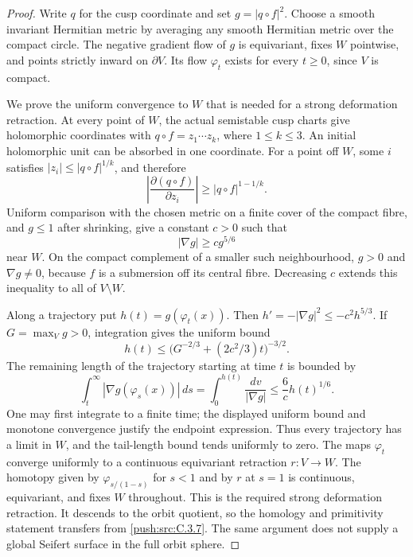 \begin{proof}
Write \(q\) for the cusp coordinate and set \(g=|q\circ f|^2\).
Choose a smooth invariant Hermitian metric by averaging any smooth
Hermitian metric over the compact circle. The negative gradient
flow of \(g\) is equivariant, fixes \(W\) pointwise, and points
strictly inward on \(\partial V\). Its flow \(\varphi_t\) exists
for every \(t\geq0\), since \(V\) is compact.

We prove the uniform convergence to \(W\) that is needed for a
strong deformation retraction. At every point of \(W\), the
actual semistable cusp charts give holomorphic coordinates with
\(q\circ f=z_1\cdots z_k\), where \(1\leq k\leq3\).
An initial holomorphic unit can be absorbed in one coordinate.
For a point off \(W\), some \(i\) satisfies
\( |z_i|\leq|q\circ f|^{1/k}\), and therefore
\[
 \left|\frac{\partial(q\circ f)}{\partial z_i}\right|
       \geq |q\circ f|^{1-1/k}.
\]
Uniform comparison with the chosen metric on a finite cover of
the compact fibre, and \(g\leq1\) after shrinking, give a
constant \(c>0\) such that
\[
 |\nabla g|\geq c g^{5/6}
\]
near \(W\). On the compact complement of a smaller such
neighbourhood, \(g>0\) and \(\nabla g\ne0\), because
\(f\) is a submersion off its central fibre. Decreasing \(c\)
extends this inequality to all of \(V\setminus W\).

Along a trajectory put \(h(t)=g(\varphi_t(x))\). Then
\(h'=-|\nabla g|^2\leq-c^2h^{5/3}\). If
\(G=\max_V g>0\), integration gives the uniform bound
\[
 h(t)\leq\bigl(G^{-2/3}+(2c^2/3)t\bigr)^{-3/2}.
\]
The remaining length of the trajectory starting at time \(t\)
is bounded by
\[
 \int_t^\infty|\nabla g(\varphi_s(x))|\,ds
 =\int_0^{h(t)}\frac{dv}{|\nabla g|}
 \leq\frac6c h(t)^{1/6}.
\]
One may first integrate to a finite time; the displayed uniform
bound and monotone convergence justify the endpoint expression.
Thus every trajectory has a limit in \(W\), and the tail-length
bound tends uniformly to zero. The maps \(\varphi_t\) converge
uniformly to a continuous equivariant retraction \(r:V\to W\).
The homotopy given by \(\varphi_{s/(1-s)}\) for \(s<1\)
and by \(r\) at \(s=1\) is continuous, equivariant, and fixes
\(W\) throughout. This is the required strong deformation
retraction. It descends to the orbit quotient, so the homology
and primitivity statement transfers from \ref{push:src:C.3.7}. The same argument
does not supply a global Seifert surface in the full orbit sphere.
\end{proof}

